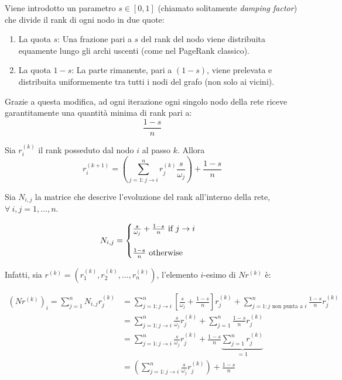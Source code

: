 Viene introdotto un parametro $s \in [0,1]$ (chiamato solitamente \textit{damping factor}) che divide il rank di ogni nodo in due quote:

\begin{enumerate}
    \item La quota $s$: Una frazione pari a $s$ del rank del nodo viene distribuita equamente lungo gli archi uscenti (come nel PageRank classico).
    \item La quota $1 - s$: La parte rimanente, pari a $(1 - s)$, viene prelevata e distribuita uniformemente tra tutti i nodi del grafo (non solo ai vicini).
\end{enumerate}

Grazie a questa modifica, ad ogni iterazione ogni singolo nodo della rete riceve garantitamente una quantità minima di rank pari a:
\[
\frac{1 - s}{n}
\]

\begin{definizione}[Rank]
    Sia $r^{(k)}_i$ il rank posseduto dal nodo $i$ al passo $k$. Allora
    \[
    r^{(k+1)}_i = \left( \sum_{j=1: j \to i}^{n} r_j^{(k)}\frac{s}{\omega_j} \right) + \frac{1-s}{n}
    \]
\end{definizione}

Sia $N_{i,j}$ la matrice che descrive l'evoluzione del rank all'interno della rete, $\forall\ i,j = 1, \dots, n$.

\[
    N_{i,j} = 
    \begin{cases}
        \frac{s}{\omega_j} + \frac{1 - s}{n} \text{ if } j \to i \vspace{0.5 cm} \\ 
        \frac{1 - s}{n} \text{ otherwise}
    \end{cases}
\]

Infatti, sia $r^{(k)} = \left( r^{(k)}_1, r^{(k)}_2, \dots, r^{(k)}_n \right)$, l'elemento $i$-esimo di $N r^{(k)}$ è:

\begin{align*}
    \left(N r^{(k)}\right)_i = \sum_{j=1}^{n} N_{i,j} r_j^{(k)} 
    &= \sum_{j=1: j \to i}^{n} \left[ \frac{s}{\omega_j} + \frac{1 - s}{n} \right]r_j^{(k)} + \sum_{j=1: j \text{ non punta a } i}^{n} \frac{1-s}{n} r_j^{(k)} \\
    &= \sum_{j=1: j \to i}^{n} \frac{s}{\omega_j}r_j^{(k)} + \sum_{j=1}^{n} \frac{1-s}{n} r_j^{(k)} \\
    &= \sum_{j=1: j \to i}^{n} \frac{s}{\omega_j}r_j^{(k)} + \frac{1-s}{n} \underbrace{\sum_{j=1}^{n} r_j^{(k)}}_{= 1} \\
    &= \left(\sum_{j=1: j \to i}^{n} \frac{s}{\omega_j}r_j^{(k)}\right) + \frac{1-s}{n}
\end{align*}


